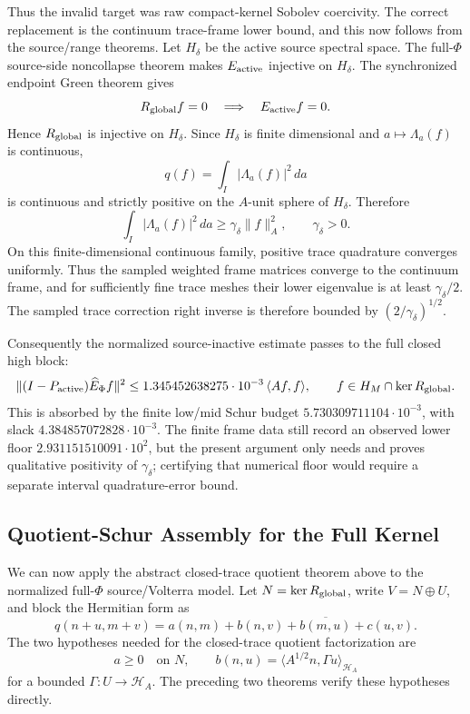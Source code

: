 \documentclass[11pt]{article}
\begin{document}
Thus the invalid target was raw compact-kernel Sobolev coercivity.  The correct
replacement is the continuum trace-frame lower bound, and this now follows from
the source/range theorems.  Let \(H_\delta\) be the active source spectral
space.  The full-\(\Phi\) source-side noncollapse theorem makes
\(E_{\rm active}\) injective on \(H_\delta\).  The synchronized endpoint Green
theorem gives
\[
  R_{\rm global}f=0\quad\Longrightarrow\quad E_{\rm active}f=0.
\]
Hence \(R_{\rm global}\) is injective on \(H_\delta\).  Since \(H_\delta\) is
finite dimensional and \(a\mapsto \Lambda_a(f)\) is continuous,
\[
  q(f)=\int_I |\Lambda_a(f)|^2\,da
\]
is continuous and strictly positive on the \(A\)-unit sphere of \(H_\delta\).
Therefore
\[
  \int_I |\Lambda_a(f)|^2\,da
  \ge \gamma_\delta \|f\|_A^2,\qquad \gamma_\delta>0.
\]
On this finite-dimensional continuous family, positive trace quadrature
converges uniformly.  Thus the sampled weighted frame matrices converge to the
continuum frame, and for sufficiently fine trace meshes their lower eigenvalue
is at least \(\gamma_\delta/2\).  The sampled trace correction right inverse is
therefore bounded by \((2/\gamma_\delta)^{1/2}\).

Consequently the normalized source-inactive estimate passes to the full closed
high block:
\[
  \|(I-P_{\rm active})\widehat E_\Phi f\|^2
  \le 1.345452638275\cdot10^{-3}\,\langle Af,f\rangle,
  \qquad f\in H_M\cap\ker R_{\rm global}.
\]
This is absorbed by the finite low/mid Schur budget
\(5.730309711104\cdot10^{-3}\), with slack
\(4.384857072828\cdot10^{-3}\).  The finite frame data still record an observed
lower floor \(2.931151510091\cdot10^2\), but the present argument only needs and
proves qualitative positivity of \(\gamma_\delta\); certifying that numerical
floor would require a separate interval quadrature-error bound.

\subsection{Quotient-Schur Assembly for the Full Kernel}

We can now apply the abstract closed-trace quotient theorem above to the
normalized full-\(\Phi\) source/Volterra model.  Let \(N=\ker R_{\rm global}\),
write \(V=N\oplus U\), and block the
Hermitian form as
\[
  q(n+u,m+v)
  = a(n,m)+b(n,v)+\overline{b(m,u)}+c(u,v).
\]
The two hypotheses needed for the closed-trace quotient factorization are
\[
  a\ge0\quad\text{on }N,
  \qquad
  b(n,u)=\langle A^{1/2}n,\Gamma u\rangle_{\mathcal H_A}
\]
for a bounded \(\Gamma:U\to\mathcal H_A\).  The preceding two theorems verify
these hypotheses directly.
\end{document}

